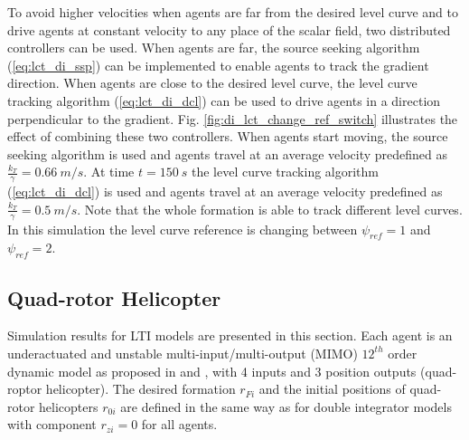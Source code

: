 To avoid higher velocities when agents are far from the desired level curve and to drive agents at constant velocity to any place of the scalar field, two distributed controllers can be used. When agents are far, the source seeking algorithm (\ref{eq:lct_di_ssp}) can be implemented to enable agents to track the gradient direction. When agents are close to the desired level curve, the level curve tracking algorithm (\ref{eq:lct_di_dcl}) can be used to drive agents in a direction perpendicular to the gradient. Fig. \ref{fig:di_lct_change_ref_switch} illustrates the effect of combining these two controllers. When agents start moving, the source seeking algorithm is used and agents travel at an average velocity predefined as $\frac{k_T}{\gamma}=0.66 \ m/s$. At time $t=150 \ s$ the level curve tracking algorithm (\ref{eq:lct_di_dcl}) is used and agents travel at an average velocity predefined as $\frac{k_T}{\gamma}=0.5 \ m/s$. Note that the whole formation is able to track different level curves.  In this simulation the level curve reference is changing between $\psi_{ref}=1$ and $\psi_{ref}=2$. 

%
 
 
\subsection{Quad-rotor Helicopter}

Simulation results for LTI models are presented in this section. 
Each agent is an underactuated and unstable multi-input/multi-output (MIMO) $12^{th}$ order dynamic model as proposed in \citep{LaraSanchezLozanoCastillo06} and \citep{PilzPopovWerner09},  with 4 inputs and 3 position outputs (quad-roptor helicopter). 
The desired formation $r_{Fi}$ and the initial positions of quad-rotor helicopters $r_{0i}$ are defined in the same way as for double integrator models with component $r_{zi}=0$ for all agents.


